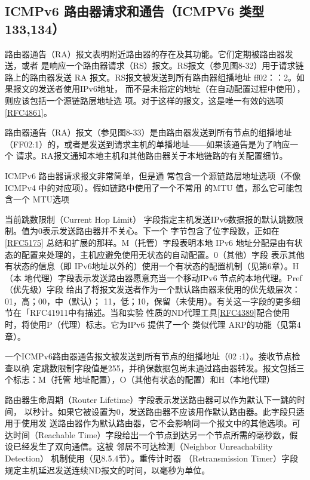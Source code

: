 \subsection{ICMPv6 路由器请求和通告（ICMPV6 类型 133,134）}
路由器通告（RA）报文表明附近路由器的存在及其功能。它们定期被路由器发送，或者
是响应一个路由器请求（RS）报文。RS报文（参见图8-32）用于请求链路上的路由器发送
RA 报文。RS报文被发送到所有路由器组播地址 ff02：：2。如果报文的发送者使用IPv6地址，
而不是未指定的地址（在自动配置过程中使用），则应该包括一个源链路层地址选
项。对于这样的报文，这是唯一有效的选项 \href{https://www.rfc-editor.org/rfc/rfc4861}{[RFC4861]}。

路由器通告（RA）报文（参见图8-33）是由路由器发送到所有节点的组播地址
（FF02:1）的，或者是发送到请求主机的单播地址——如果该通告是为了响应一个
请求。RA报文通知本地主机和其他路由器关于本地链路的有关配置细节。

ICMPv6 路由器请求报文非常简单，但是通
常包含一个源链路层地址选项（不像ICMPv4
中的对应项）。假如链路中使用了一个不常用
的MTU 值，那么它可能包含一个 MTU选项

当前跳数限制（Current Hop Limit）
字段指定主机发送IPv6数据报的默认跳数限制。值为0表示发送路由器并不关心。下一个
字节包含了位字段数，正如在\href{https://www.rfc-editor.org/rfc/rfc5175}{[RFC5175]} 总结和扩展的那样。M（托管）字段表明本地 IPv6
地址分配是由有状态的配置来处理的，主机应避免使用无状态的自动配置。0（其他）字段
表示其他有状态的信息（即 IPv6地址以外的）使用一个有状态的配置机制（见第6章）。H（本
地代理）字段表示发送路由器愿意充当一个移动IPv6 节点的本地代理。Pref（优先级）字段
给出了将报文发送者作为一个默认路由器来使用的优先级层次：01，高；00，中（默认）；
11，低；10，保留（未使用）。有关这一字段的更多细节在「RFC41911中有描述。当和实验
性质的ND代理工具\href{https://www.rfc-editor.org/rfc/rfc4389}{[RFC4389]}配合使用时，将使用P（代理）标志。它为IPv6 提供了一个
类似代理 ARP的功能（见第4章）。

一个ICMPv6路由器通告报文被发送到所有节点的组播地址（02 :1）。接收节点检查以确
定跳数限制字段值是255，并确保数据包尚未通过路由器转发。报文包括三个标志：M（托管
地址配置），O（其他有状态的配置）和H（本地代理）

路由器生命周期（Router Lifetime）字段表示发送路由器可以作为默认下一跳的时间，
以秒计。如果它被设置为0，发送路由器不应该用作默认路由器。此字段只适用于使用发
送路由器作为默认路由器，它不会影响同一个报文中的其他选项。可达时间（Reachable
Time）字段给出一个节点到达另一个节点所需的毫秒数，假设已经发生了双向通信。这被
邻居不可达检测（Neighbor Unreachability Detection） 机制使用（见8.5.4节）。重传计时器
（Retransmission Timer）字段规定主机延迟发送连续ND报文的时间，以毫秒为单位。

